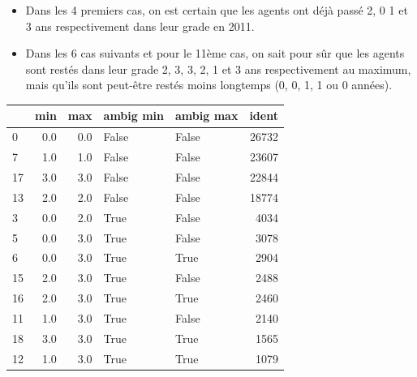 \documentclass[11pt,a4paper]{article}
\begin{document}
\begin{itemize}
	\item Dans les 4 premiers cas, on est certain que les agents ont déjà passé 2, 0 1 et 3 ans respectivement dans leur grade en 2011.
	\item Dans les 6 cas suivants et pour le 11ème cas, on sait pour sûr que les agents sont restés dans leur grade 2, 3, 3, 2, 1 et 3 ans respectivement au maximum, mais qu'ils sont peut-être restés moins longtemps (0, 0, 1, 1 ou 0 années).
\end{itemize}

\begin{tabular}{lrrllr}
	\toprule
	{} &  min  &  max & ambig min & ambig max &  ident \\
	\midrule
	0  &                           0.0 &                           0.0 &           False &           False &  26732 \\
	7  &                           1.0 &                           1.0 &           False &           False &  23607 \\
	17 &                           3.0 &                           3.0 &           False &           False &  22844 \\
	13 &                           2.0 &                           2.0 &           False &           False &  18774 \\
	3  &                           0.0 &                           2.0 &            True &           False &   4034 \\
	5  &                           0.0 &                           3.0 &            True &           False &   3078 \\
	6  &                           0.0 &                           3.0 &            True &            True &   2904 \\
	15 &                           2.0 &                           3.0 &            True &           False &   2488 \\
	16 &                           2.0 &                           3.0 &            True &            True &   2460 \\
	11 &                           1.0 &                           3.0 &            True &           False &   2140 \\
	18 &                           3.0 &                           3.0 &            True &            True &   1565 \\
	12 &                           1.0 &                           3.0 &            True &            True &   1079 \\

\end{tabular}
\end{document}
